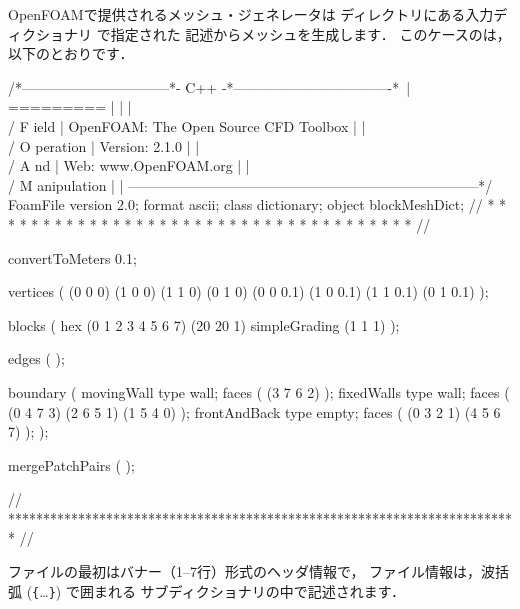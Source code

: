 OpenFOAMで提供されるメッシュ・ジェネレータは
ディレクトリにある入力ディクショナリ
%
%
で指定された
記述からメッシュを生成します．
このケースのは，以下のとおりです．
\begin{OFverbatim}
/*--------------------------------*- C++ -*----------------------------------*\
| =========                 |                                                 |
| \\      /  F ield         | OpenFOAM: The Open Source CFD Toolbox           |
|  \\    /   O peration     | Version:  2.1.0                                 |
|   \\  /    A nd           | Web:      www.OpenFOAM.org                      |
|    \\/     M anipulation  |                                                 |
\*---------------------------------------------------------------------------*/
FoamFile
{
    version     2.0;
    format      ascii;
    class       dictionary;
    object      blockMeshDict;
}
// * * * * * * * * * * * * * * * * * * * * * * * * * * * * * * * * * * * * * //

convertToMeters 0.1;

vertices        
(
    (0 0 0)
    (1 0 0)
    (1 1 0)
    (0 1 0)
    (0 0 0.1)
    (1 0 0.1)
    (1 1 0.1)
    (0 1 0.1)
);

blocks          
(
    hex (0 1 2 3 4 5 6 7) (20 20 1) simpleGrading (1 1 1)
);

edges           
(
);

boundary
(
    movingWall 
    {
        type wall;
        faces
        (
            (3 7 6 2)
        );
    }
    fixedWalls 
    {
        type wall;
        faces
        (
            (0 4 7 3)
            (2 6 5 1)
            (1 5 4 0)
        );
    }
    frontAndBack 
    {
        type empty;
        faces
        (
            (0 3 2 1)
            (4 5 6 7)
        );
    }
);

mergePatchPairs 
(
);

// ************************************************************************* //
\end{OFverbatim}
ファイルの最初はバナー（1--7行）形式のヘッダ情報で，
ファイル情報は，波括弧 (\verb|{|\ldots\verb|}|) で囲まれる
サブディクショナリの中で記述されます．

